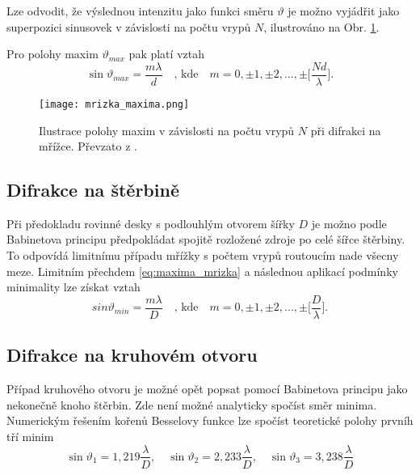 		Lze odvodit, že výslednou intenzitu jako funkci směru $\vartheta$ je možno vyjádřit jako superpozici sinusovek v závislosti na počtu vrypů $N$, ilustrováno na Obr. \ref{fig:mrizka_maxima}.

		Pro polohy maxim $\vartheta_{max}$ pak platí \cite{navod} vztah
		\begin{equation}
			\sin \vartheta _{max} = \frac{m \lambda}{d} \quad \textrm{, kde} \quad m = 0, \pm 1, \pm 2,... , \pm \Bigg[ \frac{Nd}{\lambda}\Bigg].
			\label{eq:maxima_mrizka}
		\end{equation}
		\begin{figure}[!ht]
			\begin{center}
				\texttt{[image: mrizka\_maxima.png]}
			\end{center}
			\caption{Ilustrace polohy maxim v závislosti na počtu vrypů $N$ při difrakci na mřížce. Převzato z \cite{navod}.}
			\label{fig:mrizka_maxima}
		\end{figure}
		
	\subsection{Difrakce na štěrbině} %
	\label{sub:difrakce_na_štěrbině}
		Při předokladu rovinné desky s podlouhlým otvorem šířky $D$ je možno podle Babinetova principu předpokládat spojitě rozložené zdroje po celé šířce štěrbiny. To odpovídá limitnímu případu mřížky s počtem vrypů routoucím nade všecny meze. Limitním přechdem \eqref{eq:maxima_mrizka} a následnou aplikací podmínky minimality lze \cite{navod} získat vztah
		\begin{equation}
			sin \vartheta_{min} = \frac{m \lambda}{D} \quad \textrm{, kde} \quad m = 0, \pm 1, \pm 2,... , \pm \Bigg[ \frac{D}{\lambda}\Bigg].
			\label{eq:minima_sterbina}
		\end{equation}
	\subsection{Difrakce na kruhovém otvoru} %
	\label{sub:difrakce_na_kruhovém_otvoru}
		Případ kruhového otvoru je možné opět popsat pomocí Babinetova principu jako nekonečně knoho štěrbin. Zde není možné analyticky spočíst směr minima. Numerickým řešením kořenů Besselovy funkce lze spočíst teoretické polohy prvníh tří minim
		\begin{equation}
			\sin \vartheta_1 = 1,219 \frac \lambda D, \quad \sin \vartheta_2 = 2,233 \frac \lambda D, \quad \sin \vartheta_3 = 3,238 \frac \lambda D
			\label{eq:minima_kruh}
		\end{equation}
